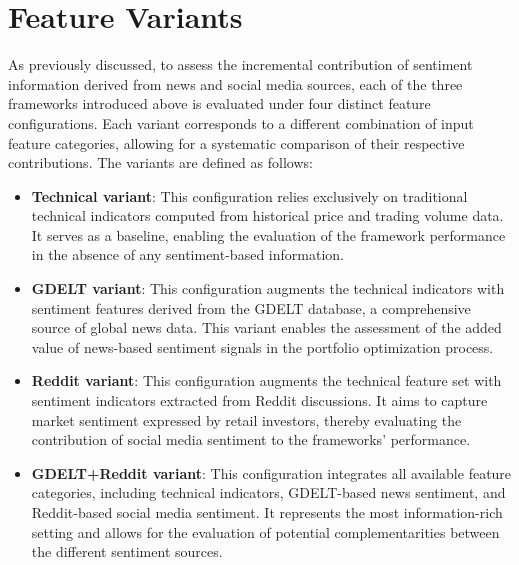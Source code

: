 \section{Feature Variants}
\label{sec:4variants}

As previously discussed, to assess the incremental contribution of sentiment information derived from news and social media sources, each of the three frameworks introduced above is evaluated under four distinct feature configurations. Each variant corresponds to a different combination of input feature categories, allowing for a systematic comparison of their respective contributions. The variants are defined as follows:

\begin{itemize}

\item \textbf{Technical variant}: This configuration relies exclusively on traditional technical indicators computed from historical price and trading volume data. It serves as a baseline, enabling the evaluation of the framework performance in the absence of any sentiment-based information.

\item \textbf{GDELT variant}: This configuration augments the technical indicators with sentiment features derived from the GDELT database, a comprehensive source of global news data. This variant enables the assessment of the added value of news-based sentiment signals in the portfolio optimization process.

\item \textbf{Reddit variant}: This configuration augments the technical feature set with sentiment indicators extracted from Reddit discussions. It aims to capture market sentiment expressed by retail investors, thereby evaluating the contribution of social media sentiment to the frameworks' performance.

\item \textbf{GDELT+Reddit variant}: This configuration integrates all available feature categories, including technical indicators, GDELT-based news sentiment, and Reddit-based social media sentiment. It represents the most information-rich setting and allows for the evaluation of potential complementarities between the different sentiment sources.

\end{itemize}

